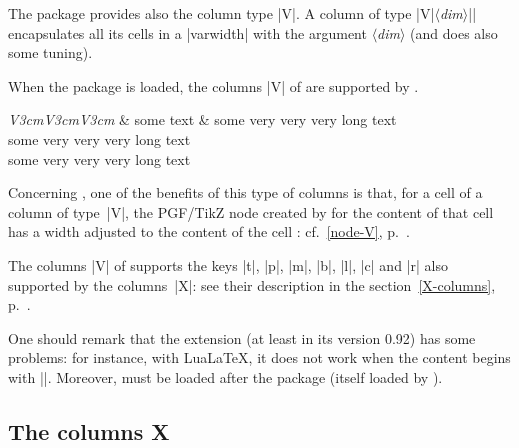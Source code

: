 \documentclass[dvipsnames]{article}
\begin{document}
\bigskip
\begin{Code}[width=6cm,show-output]
\end{Code}


\bigskip
The package  provides also the column type |V|. A column of type
|V{|$\langle$\textsl{dim}$\rangle$|}| encapsulates all its cells in a
|{varwidth}| with the argument $\langle$\textsl{dim}$\rangle$ (and does also some tuning).

\smallskip
When the package  is loaded, the columns |V| of 
are supported by . 

\medskip
\begin{Code}
\begin{NiceTabular}[corners=NW,hvlines]{\emph{V{3cm}V{3cm}V{3cm}}}
  & some text & some very very very long text \\
  some very very very long text \\
  some very very very long text 
\end{NiceTabular}
\end{Code}

\bigskip
Concerning , one of the benefits of this type of columns is
that, for a cell of a column of type~|V|, the PGF/TikZ node created by
 for the content of that cell has a width adjusted to the
content of the cell : cf.~\ref{node-V}, p.~\pageref{node-V}.


\bigskip
The columns |V| of  supports the keys |t|, |p|, |m|, |b|, |l|,
|c| and |r| also supported by the columns~|X|: see their description in the
section~\ref{X-columns}, p.~\pageref{X-columns}.

\bigskip
One should remark that the extension  (at least in its version
0.92) has some problems: for instance, with LuaLaTeX, it does not work when
the content begins with |\color|. Moreover,  must be loaded after
the package  (itself loaded by ).


\subsection{The columns X}
\end{document}
